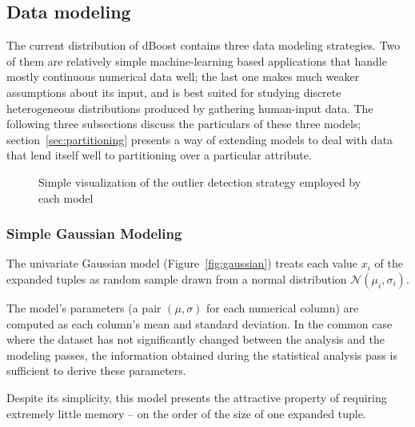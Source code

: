 \subsection{Data modeling}
\label{sec:model-creation}

The current distribution of dBoost contains three data modeling strategies. Two of them are relatively simple machine-learning based applications that handle mostly continuous numerical data well; the last one makes much weaker assumptions about its input, and is best suited for studying discrete heterogeneous distributions produced by gathering human-input data. The following three subsections discuss the particulars of these three models; section~\ref{sec:partitioning} presents a way of extending models to deal with data that lend itself well to partitioning over a particular attribute.

\begin{figure}%
  \centering
  \newcommand{\cramped}[3]{\subfloat[#2]{\texttt{[image: \#1]}\label{fig:#3}}}
  \cramped{../graphics/gaussians-preview.pdf}{Gaussian}{gaussian}\hspace*{.01\linewidth}
  \cramped{../graphics/mixtures-preview.png}{Mixture}{mixture}\hspace*{.01\linewidth}
  \cramped{../graphics/histograms-preview.pdf}{Histogram}{histogram}
  \caption{Simple visualization of the outlier detection strategy employed by each model}
  \label{fig:models}
\end{figure}

\subsubsection{Simple Gaussian Modeling}
\label{sec:gaus_model}
The univariate Gaussian model (Figure~\ref{fig:gaussian}) treats each value $x_i$ of the expanded tuples as random sample drawn from a normal distribution $\mathcal N(\mu_i, \sigma_i)$.

The model's parameters (a pair $(\mu, \sigma)$ for each numerical column) are computed as each column's mean and standard deviation. In the common case where the dataset has not significantly changed between the analysis and the modeling passes, the information obtained during the statistical analysis pass is sufficient to derive these parameters.

Despite its simplicity, this model presents the attractive property of requiring extremely little memory -- on the order of the size of one expanded tuple.

